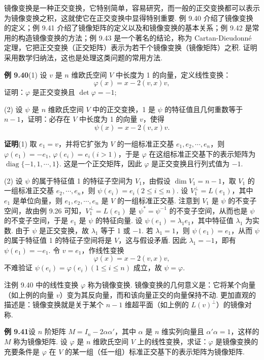 \documentclass[UTF8, 12pt, fontset=fandol, oneside]{ctexart}
\begin{document}
镜像变换是一种正交变换，它特别简单，容易研究，而一般的正交变换都可以表示为镜像变换之积，这就使它在正交变换中显得特别重要. 例 9.40 介绍了镜像变换的定义；例 9.41 介绍了镜像矩阵的定义以及和镜像变换的基本关系；例 9.42 是常用的构造镜像变换的方法；例 9.43 是一个著名的结论，称为 Cartan-Dieudonné 定理，它把正交变换（正交矩阵）表示为若干个镜像变换（镜像矩阵）之积. 证明采用数学归纳法，这也是处理这类问题的常用方法.

\noindent\textbf{例 9.40}\quad (1) 设 $v$ 是 $n$ 维欧氏空间 $V$ 中长度为 1 的向量，定义线性变换：
\[
\varphi(x)=x-2(v,x)v,
\]
证明：$\varphi$ 是正交变换且 $\det\varphi=-1$;

(2) 设 $\psi$ 是 $n$ 维欧氏空间 $V$ 中的正交变换，1 是 $\psi$ 的特征值且几何重数等于 $n-1$，证明：必存在 $V$ 中长度为 1 的向量 $v$，使得
\[
\psi(x)=x-2(v,x)v.
\]

\noindent\textbf{证明}\quad (1) 取 $e_1=v$，并将它扩张为 $V$ 的一组标准正交基 $e_1,e_2,\cdots,e_n$，则 $\varphi(e_1)=-e_1$, $\varphi(e_i)=e_i(i>1)$，于是 $\varphi$ 在这组标准正交基下的表示矩阵为 $\operatorname{diag}\{-1,1,\cdots,1\}$. 这是一个正交矩阵，因此 $\varphi$ 是正交变换且行列式值为 $-1$.

(2) 设 $\psi$ 的属于特征值 1 的特征子空间为 $V_1$，由假设 $\dim V_1=n-1$，取 $V_1$ 的一组标准正交基 $e_2,\cdots,e_n$，则 $\psi(e_i)=e_i(2\le i\le n)$. 设 $V_1^\perp=L(e_1)$，其中 $e_1$ 是单位向量，则 $e_1,e_2,\cdots,e_n$ 是 $V$ 的一组标准正交基. 注意到 $V_1$ 是 $\psi$ 的不变子空间，故由例 9.26 可知，$V_1^\perp=L(e_1)$ 是 $\psi^*=\psi^{-1}$ 的不变子空间，从而也是 $\psi$ 的不变子空间，于是 $e_1$ 是 $\psi$ 的特征向量. 设 $\psi(e_1)=\lambda_1e_1$，其中特征值 $\lambda_1$ 为实数. 由于 $\psi$ 是正交变换，故 $\lambda_1$ 等于 1 或 $-1$. 若 $\lambda_1=1$，则 $\psi(e_1)=e_1$，从而 $\psi$ 的属于特征值 1 的特征子空间将是 $V$，这与假设矛盾. 因此 $\lambda_1=-1$，即有 $\psi(e_1)=-e_1$. 令 $v=e_1$，作线性变换
\[
\varphi(x)=x-2(v,x)v,
\]
不难验证 $\psi(e_i)=\varphi(e_i)(1\le i\le n)$ 成立，故 $\psi=\varphi$.

注\quad 例 9.40 中的线性变换 $\varphi$ 称为镜像变换. 镜像变换的几何意义是：它将某个向量（如上例的向量 $v$）变为其反向量，而和该向量正交的向量保持不动. 更加直观的描述是：镜像变换就是关于某个 $n-1$ 维超平面（如上例的 $L(v)^\perp$）的镜像对称.

\noindent\textbf{例 9.41}\quad 设 $n$ 阶矩阵 $M=I_n-2\alpha\alpha'$，其中 $\alpha$ 是 $n$ 维实列向量且 $\alpha'\alpha=1$，这样的 $M$ 称为镜像矩阵. 设 $\varphi$ 是 $n$ 维欧氏空间 $V$ 上的线性变换，求证：$\varphi$ 是镜像变换的充要条件是 $\varphi$ 在 $V$ 的某一组（任一组）标准正交基下的表示矩阵为镜像矩阵.
\end{document}
